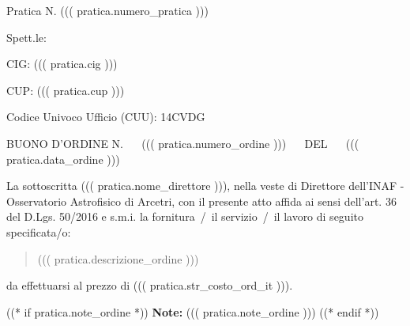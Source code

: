 \documentclass[a4paper,12pt]{letter}
\begin{document}
\topaddr

{\small Pratica N. ((( pratica.numero_pratica ))) }
\vspace{.4cm}

\begin{flushright}
\begin{minipage}{10cm}
Spett.le:\\
\end{minipage}
\end{flushright}
\vspace{5mm}

CIG: ((( pratica.cig ))) 

CUP: ((( pratica.cup )))

Codice Univoco Ufficio (CUU): 14CVDG

BUONO D'ORDINE N. ~~ ((( pratica.numero_ordine ))) ~~ DEL ~~ ((( pratica.data_ordine )))

La sottoscritta ((( pratica.nome_direttore ))), 
nella veste di Direttore dell'INAF - Osservatorio Astrofisico di Arcetri,
con il presente atto affida ai sensi dell'art. 36 del D.Lgs. 50/2016 e s.m.i.
la fornitura~/~il servizio~/~il lavoro di seguito specificata/o:

\begin{quote}
((( pratica.descrizione_ordine )))
\end{quote}

da effettuarsi al prezzo di ((( pratica.str_costo_ord_it ))).

((* if pratica.note_ordine *))
{\bf Note:} ((( pratica.note_ordine )))
((* endif *))
\vspace{1cm}
\end{document}
